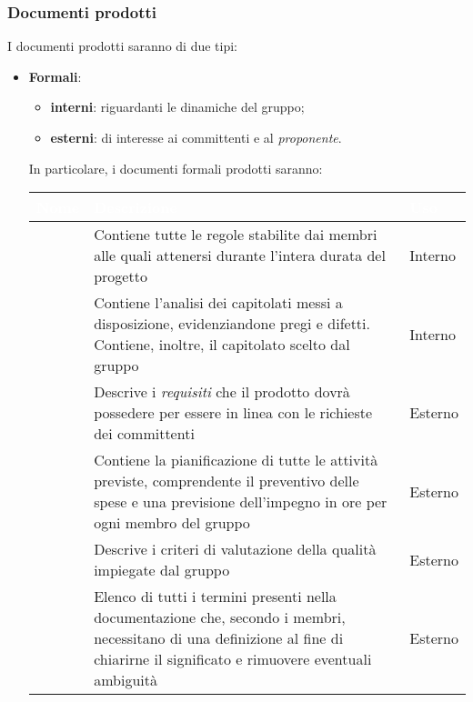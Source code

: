 	\subsubsection{Documenti prodotti}
		I documenti prodotti saranno di due tipi:
			\begin{itemize}
				\item \textbf{Formali}:
				\begin{itemize}
					\item \textbf{interni}: riguardanti le dinamiche del gruppo;
					\item \textbf{esterni}: di interesse ai committenti e al \emph{proponente}.
				\end{itemize} 
				In particolare, i documenti formali prodotti saranno:
				
				{
				\setlength{\freewidth}{\dimexpr\textwidth-1\tabcolsep}
				\renewcommand{\arraystretch}{1.5}
				\centering
				\setlength{\aboverulesep}{0pt}
				\setlength{\belowrulesep}{0pt}
				\begin{longtable}{C{.24\freewidth} C{.58\freewidth} C{.12\freewidth}}
					\toprule
					\textcolor{white}{\textbf{Nome}}&
					\textcolor{white}{\textbf{Descrizione}}&
					\textcolor{white}{\textbf{Uso}}\\	
					\toprule
					\endhead
					\NdP{} & Contiene tutte le regole stabilite dai membri alle quali attenersi durante l'intera durata del progetto & Interno \\	
					\VdC{} & Contiene l'analisi dei capitolati messi a disposizione, evidenziandone pregi e difetti. Contiene, inoltre, il capitolato scelto dal gruppo & Interno \\
					\AdR{} & Descrive i \emph{requisiti} che il prodotto dovrà possedere per essere in linea con le richieste dei committenti & Esterno \\
					\PdP{} & Contiene la pianificazione di tutte le attività previste, comprendente il preventivo delle spese e una previsione dell'impegno in ore per ogni membro del gruppo & Esterno \\
					\PdQ{} & Descrive i criteri di valutazione della qualità impiegate dal gruppo & Esterno \\
					\Glo{} & Elenco di tutti i termini presenti nella documentazione che, secondo i membri, necessitano di una definizione al fine di chiarirne il significato e rimuovere eventuali ambiguità & Esterno \\
					\bottomrule
				\end{longtable}
}
\end{itemize}
